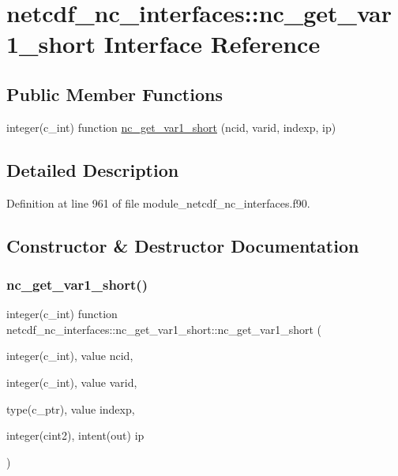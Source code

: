 \hypertarget{interfacenetcdf__nc__interfaces_1_1nc__get__var1__short}{}\section{netcdf\+\_\+nc\+\_\+interfaces\+:\+:nc\+\_\+get\+\_\+var1\+\_\+short Interface Reference}
\label{interfacenetcdf__nc__interfaces_1_1nc__get__var1__short}
\subsection*{Public Member Functions}
\begin{DoxyCompactItemize}
\item 
integer(c\+\_\+int) function \hyperlink{interfacenetcdf__nc__interfaces_1_1nc__get__var1__short_a108f0f8474eb1becbe1c0fc578e1743f}{nc\+\_\+get\+\_\+var1\+\_\+short} (ncid, varid, indexp, ip)
\end{DoxyCompactItemize}


\subsection{Detailed Description}


Definition at line 961 of file module\+\_\+netcdf\+\_\+nc\+\_\+interfaces.\+f90.



\subsection{Constructor \& Destructor Documentation}
\mbox{\label{interfacenetcdf__nc__interfaces_1_1nc__get__var1__short_a108f0f8474eb1becbe1c0fc578e1743f}} 
\subsubsection{\texorpdfstring{nc\+\_\+get\+\_\+var1\+\_\+short()}{nc\_get\_var1\_short()}}
{\footnotesize\ttfamily integer(c\+\_\+int) function netcdf\+\_\+nc\+\_\+interfaces\+::nc\+\_\+get\+\_\+var1\+\_\+short\+::nc\+\_\+get\+\_\+var1\+\_\+short (\begin{DoxyParamCaption}\item[{integer(c\+\_\+int), value}]{ncid,  }\item[{integer(c\+\_\+int), value}]{varid,  }\item[{type(c\+\_\+ptr), value}]{indexp,  }\item[{integer(cint2), intent(out)}]{ip }\end{DoxyParamCaption})}



